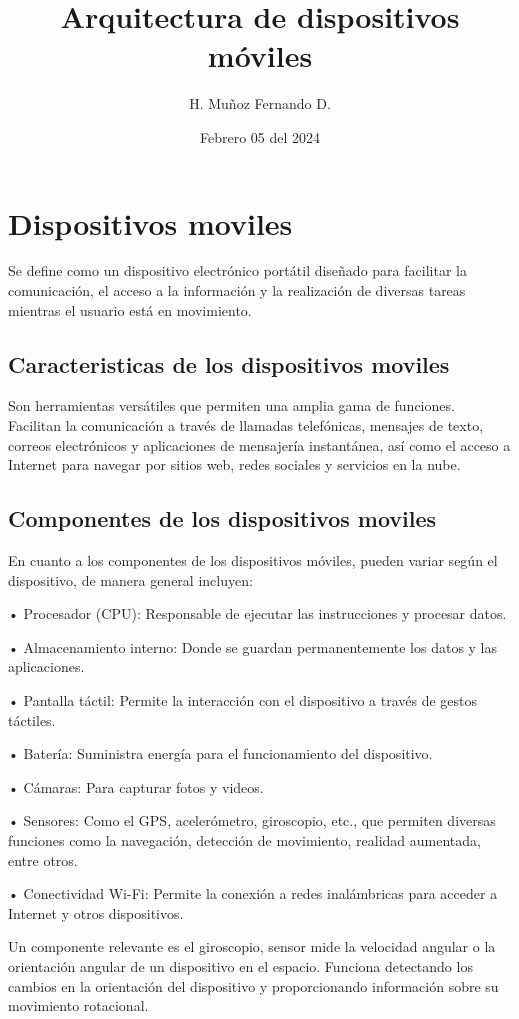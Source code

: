 \documentclass{article}
\title{Arquitectura de dispositivos móviles}
\author{H. Muñoz Fernando D.}
\date{Febrero 05 del 2024}
\begin{document}
 
		
		\section{Dispositivos moviles}
Se define como un dispositivo electrónico portátil diseñado para facilitar la comunicación, el acceso a la información y la realización de diversas tareas mientras el usuario está en movimiento. 
		\subsection{Caracteristicas de los dispositivos moviles}
		
		Son herramientas versátiles que permiten una amplia gama de funciones. Facilitan la comunicación a través de llamadas telefónicas, mensajes de texto, correos electrónicos y aplicaciones de mensajería instantánea, así como el acceso a Internet para navegar por sitios web, redes sociales y servicios en la nube. 
		
		\subsection{Componentes de los dispositivos moviles}
		En cuanto a los componentes de los dispositivos móviles, pueden variar según el dispositivo, de manera general incluyen:
		
		• Procesador (CPU): Responsable de ejecutar las instrucciones y procesar datos.
		
		• Almacenamiento interno: Donde se guardan permanentemente los datos y las aplicaciones.
	
		• Pantalla táctil: Permite la interacción con el dispositivo a través de gestos táctiles.
	
		• Batería: Suministra energía para el funcionamiento del dispositivo.
		
		• Cámaras: Para capturar fotos y videos.
		
		• Sensores: Como el GPS, acelerómetro, giroscopio, etc., que permiten diversas funciones como la navegación, detección de movimiento, realidad aumentada, entre otros.
		
		• Conectividad Wi-Fi: Permite la conexión a redes inalámbricas para acceder a Internet y otros dispositivos.
		
		Un componente relevante es el giroscopio, sensor mide la velocidad angular o la orientación angular de un dispositivo en el espacio. Funciona detectando los cambios en la orientación del dispositivo y proporcionando información sobre su movimiento rotacional.
		
\end{document}
